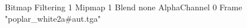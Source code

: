 {Bitmap
	{Filtering 1}
	{Mipmap 1}
	{Blend none}
	{AlphaChannel 0}
	{Frame "poplar_white2a#aut.tga"}
}
